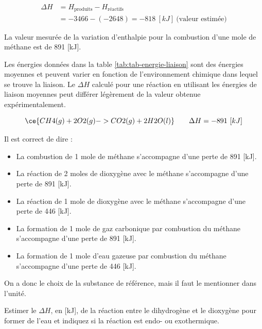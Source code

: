 \documentclass[
  11pt,
  french,
  a4paper,
  openany]{book}
\providecommand{\tightlist}{%
  \setlength{\itemsep}{0pt}\setlength{\parskip}{0pt}}
\begin{document}
\[
\begin{split}
\Delta H &= H _{\text{produits}} − H _{\text{réactifs}} \\
  &= -3466 -(-2648) = -818\ [kJ]\ \text{(valeur estimée)}
\end{split}
\]

La valeur mesurée de la variation d'enthalpie pour la combustion d'une mole de méthane est de 891 {[}kJ{]}.

Les énergies données dans la table \ref{tab:tab-energie-liaison} sont des énergies moyennes et peuvent varier en fonction de l'environnement chimique dans lequel se trouve la liaison. Le \(\Delta H\) calculé pour une réaction en utilisant les énergies de liaison moyennes peut différer légèrement de la valeur obtenue expérimentalement.

\[
\ce{CH4(g) + 2 O2(g) -> CO2(g) + 2 H2O(l)} \qquad \Delta H = -891\ [kJ]
\]

Il est correct de dire :

\begin{itemize}
\tightlist
\item
  La combustion de 1 mole de méthane s'accompagne d'une perte de 891 {[}kJ{]}.
\item
  La réaction de 2 moles de dioxygène avec le méthane s'accompagne d'une perte de 891 {[}kJ{]}.
\item
  La réaction de 1 mole de dioxygène avec le méthane s'accompagne d'une perte de 446 {[}kJ{]}.
\item
  La formation de 1 mole de gaz carbonique par combustion du méthane s'accompagne d'une perte de 891 {[}kJ{]}.
\item
  La formation de 1 mole d'eau gazeuse par combustion du méthane s'accompagne d'une perte de 446 {[}kJ{]}.
\end{itemize}

On a donc le choix de la substance de référence, mais il faut le mentionner dans l'unité.

\clearpage

\begin{Exercise}

Estimer le \(\Delta H\), en {[}kJ{]}, de la réaction entre le dihydrogène et le dioxygène pour former de l'eau et indiquez si la réaction est endo- ou exothermique.



\end{Exercise}
\end{document}
